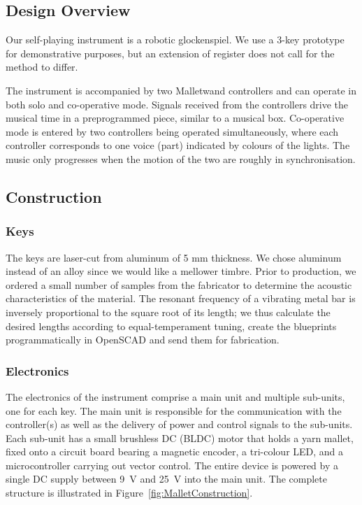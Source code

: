 \documentclass{nime-alternate} %
\begin{document}
\subsection{Design Overview}
Our self-playing instrument is a robotic glockenspiel. We use a 3-key prototype for demonstrative purposes, but an extension of register does not call for the method to differ.

The instrument is accompanied by two Malletwand controllers and can operate in both solo and co-operative mode. Signals received from the controllers drive the musical time in a preprogrammed piece, similar to a musical box. Co-operative mode is entered by two controllers being operated simultaneously, where each controller corresponds to one voice (part) indicated by colours of the lights. The music only progresses when the motion of the two are roughly in synchronisation.

\subsection{Construction}
\subsubsection{Keys}
The keys are laser-cut from aluminum of 5 mm thickness. We chose aluminum instead of an alloy since we would like a mellower timbre. Prior to production, we ordered a small number of samples from the fabricator to determine the acoustic characteristics of the material. The resonant frequency of a vibrating metal bar is inversely proportional to the square root of its length; we thus calculate the desired lengths according to equal-temperament tuning, create the blueprints programmatically in OpenSCAD and send them for fabrication.

\subsubsection{Electronics}
The electronics of the instrument comprise a main unit and multiple sub-units, one for each key. The main unit is responsible for the communication with the controller(s) as well as the delivery of power and control signals to the sub-units. Each sub-unit has a small brushless DC (BLDC) motor that holds a yarn mallet, fixed onto a circuit board bearing a magnetic encoder, a tri-colour LED, and a microcontroller carrying out vector control. The entire device is powered by a single DC supply between 9~V and 25~V into the main unit. The complete structure is illustrated in Figure~\ref{fig:MalletConstruction}.
\end{document}
